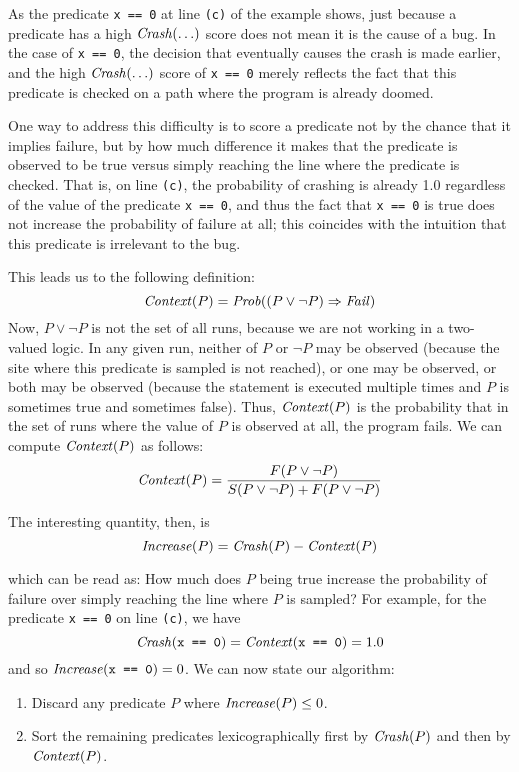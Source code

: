 As the predicate {\tt x == 0} at line {\tt (c)} of the example
shows, just because a predicate has a high $\mbox{\textit{Crash}}(\ldots)$ score does not
mean it is the cause of a bug.  In the case of {\tt x == 0}, the
decision that eventually causes the crash is made earlier, and the
high $\mbox{\textit{Crash}}(\ldots)$ score of {\tt x == 0} merely reflects the fact that this
predicate is checked on a path where the program is already doomed.

One way to address this difficulty is to score a predicate not by the chance
that it implies failure, but by how much difference it makes that the predicate
is observed to be true versus simply reaching the line where the predicate is checked.
That is, on line {\tt (c)}, the probability of crashing is already 1.0 regardless
of the value of the predicate {\tt x == 0}, and thus the fact that {\tt x == 0} is
true does not increase the probability of failure at all; this coincides with
the intuition that this predicate is irrelevant to the bug.

This leads us to the following definition:
\[ \mbox{\textit{Context}}(P) = \mbox{\textit{Prob}}((P \lor \lnot P) \Rightarrow \mbox{\textit{Fail}}) \]
Now, $P \lor \lnot P$ is not the set of all runs, because we are not working in a two-valued logic.
In any given run, neither of $P$ or $\lnot P$ may be observed (because the site where this predicate is
sampled is not reached), or one may be observed, or both may be observed (because the statement is executed
multiple times and $P$ is sometimes true and sometimes false).  Thus, $\mbox{\textit{Context}}(P)$ is the probability that
in the set of runs where the value of $P$ is observed at all, the program fails. We can compute $\mbox{\textit{Context}}(P)$ as follows:
\[ \mbox{\textit{Context}}(P) = \frac{F(P \lor \lnot P)}{S(P \lor \lnot P) + F(P \lor \lnot P)} \]

The interesting quantity, then, is
\begin{equation}
 \mbox{\textit{Increase}}(P) = \mbox{\textit{Crash}}(P) - \mbox{\textit{Context}}(P) \label{eqn:1}
\end{equation}

which can be read as: How much does $P$ being true increase the probability of failure
over simply reaching the line where $P$ is sampled?  For example, for the predicate {\tt x == 0} on line {\tt (c)},
we have
\[\mbox{\textit{Crash}}(\mbox{\tt x == 0}) = \mbox{\textit{Context}}(\mbox{\tt x == 0}) = 1.0 \]
and so $\mbox{\textit{Increase}}(\mbox{\tt x == 0}) = 0$.
We can now state our algorithm:
\begin{enumerate}
\item Discard any predicate $P$ where $\mbox{\textit{Increase}}(P) \leq 0$.

\item Sort the remaining predicates lexicographically first by $\mbox{\textit{Crash}}(P)$ and then by $\mbox{\textit{Context}}(P)$.
\end{enumerate}

